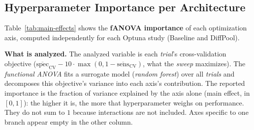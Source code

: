 \documentclass[10pt,a4paper,twocolumn,twoside]{article}
\begin{document}
\newpage

\subsection{Hyperparameter Importance per Architecture}
\label{app:main-effects}

Table~\ref{tab:main-effects} shows the \textbf{fANOVA importance} of each optimization
axis, computed independently for each Optuna study (Baseline and
DiffPool).

\textbf{What is analyzed.} The analyzed variable is each \textit{trial}'s cross-validation objective
($\overline{\text{spec}}_{\text{CV}} - 10\cdot\max(0,
1-\overline{\text{sens}}_{\text{CV}})$, what the \textit{sweep} maximizes). The
\textit{functional ANOVA} fits a surrogate model (\textit{random forest}) over all
\textit{trials} and decomposes this objective's variance into each axis's contribution. The
reported importance is the fraction of variance explained by the axis alone (main
effect, in $[0, 1]$): the higher it is, the more that hyperparameter weighs on performance. They do not
sum to $1$ because interactions are not included. Axes specific to one branch
appear empty in the other column.
\end{document}
